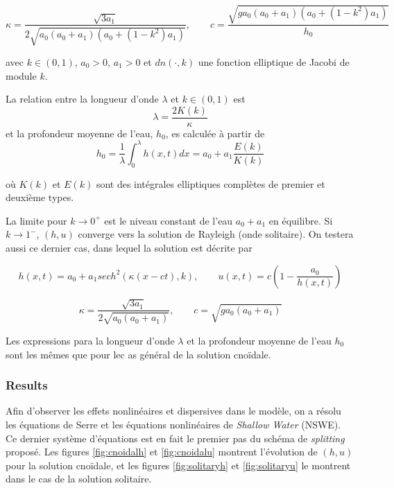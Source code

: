 \begin{equation*}
    \kappa = \frac{\sqrt{3a_1}}{2\sqrt{a_0(a_0+a_1)(a_0+(1-k^2)a_1)}}, \qquad
    c = \frac{\sqrt{g a_0(a_0+a_1)(a_0+(1-k^2)a_1)}}{h_0}
\end{equation*}

\noindent avec $k\in(0,1)$, $a_0>0$, $a_1>0$ et $dn(\cdot,k)$ une fonction elliptique de Jacobi de module $k$.

\indent La relation entre la longueur d'onde $\lambda$ et $k\in(0,1)$ est $$\lambda = \frac{2K(k)}{\kappa}$$ et la profondeur moyenne de l'eau, $h_0$, es calculée à partir de $$h_0 = \frac{1}{\lambda}\int_{0}^\lambda h(x,t)dx = a_0 + a_1 \frac{E(k)}{K(k)}$$

\noindent où $K(k)$ et $E(k)$ sont des intégrales elliptiques complètes de premier et deuxième types. 

\indent La limite pour $k\to0^+$ est le niveau constant de l'eau $a_0+a_1$ en équilibre. Si $k\to1^-$, $(h,u)$ converge vers la solution de Rayleigh (onde solitaire). On testera aussi ce dernier cas, dans lequel la solution est décrite par

\begin{equation*}
    h(x,t) = a_0 + a_1 sech^2(\kappa(x-ct),k), \qquad
    u(x,t) = c\left( 1 - \frac{a_0}{h(x,t)}\right)
\end{equation*}

\begin{equation*}
    \kappa = \frac{\sqrt{3a_1}}{2\sqrt{a_0(a_0+a_1)}}, \qquad
    c = \sqrt{g a_0(a_0+a_1)}
\end{equation*}

\indent Les expressions para la longueur d'onde $\lambda$ et la profondeur moyenne de l'eau $h_0$ sont les mêmes que pour lec as général de la solution cnoïdale.

\subsubsection{Results}

\indent Afin d'observer les effets nonlinéaires et dispersives dans le modèle, on a résolu les équations de Serre et les équations nonlinéaires de \emph{Shallow Water} (NSWE). Ce dernier système d'équations est en fait le premier pas du schéma de \emph{splitting} proposé. Les figures \ref{fig:cnoidalh} et \ref{fig:cnoidalu} montrent l'évolution de $(h,u)$ pour la solution cnoïdale, et les figures  \ref{fig:solitaryh} et \ref{fig:solitaryu} le montrent dans le cas de la solution solitaire. 

